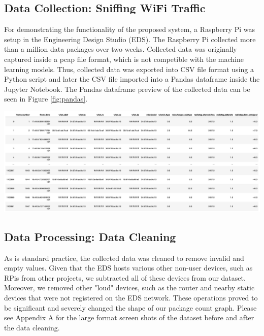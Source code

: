 \documentclass[journal, 12pt]{IEEEtran}
\begin{document}
\subsection{Data Collection: Sniffing WiFi Traffic}
\noindent For demonstrating the functionality of the proposed system, a Raspberry Pi was setup in the Engineering Design Studio (EDS). The Raspberry Pi collected more than a million data packages over two weeks. Collected data was originally captured inside a pcap file format, which is not competible with the machine learning models. Thus, collected data was exported into CSV file format using a Python script and later the CSV file imported into a Pandas dataframe inside the Jupyter Notebook. The Pandas dataframe preview of the collected data can be seen in Figure \ref{fig:pandas}.

\begingroup
    \center
    \includegraphics[width=\columnwidth]{report/interim_report/images/pandas.png}
    \label{fig:pandas}
\endgroup

\subsection{Data Processing: Data Cleaning} 
\noindent As is standard practice, the collected data was cleaned to remove invalid and empty values. Given that the EDS hosts various other non-user devices, such as RPis from other projects, we subtracted all of these devices from our dataset. Moreover, we removed other "loud" devices, such as the router and nearby static devices that were not registered on the EDS network. These operations proved to be significant and severely changed the shape of our package count graph. Please see Appendix A for the large format screen shots of the dataset before and after the data cleaning.
\end{document}
